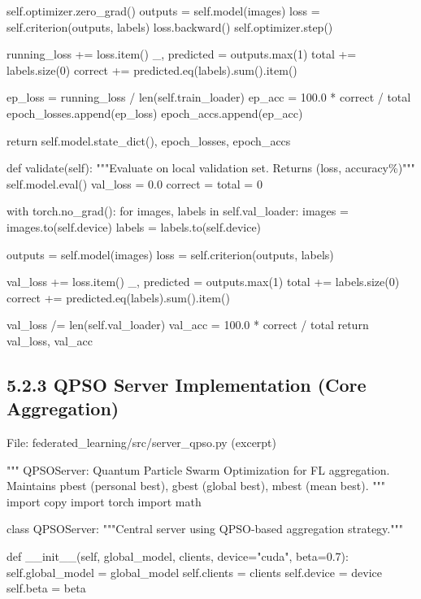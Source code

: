                 self.optimizer.zero\_grad()
                outputs = self.model(images)
                loss = self.criterion(outputs, labels)
                loss.backward()
                self.optimizer.step()
                
                running\_loss += loss.item()
                \_, predicted = outputs.max(1)
                total += labels.size(0)
                correct += predicted.eq(labels).sum().item()
            
            ep\_loss = running\_loss / len(self.train\_loader)
            ep\_acc = 100.0 * correct / total
            epoch\_losses.append(ep\_loss)
            epoch\_accs.append(ep\_acc)
        
        return self.model.state\_dict(), epoch\_losses, epoch\_accs
    
    def validate(self):
        """Evaluate on local validation set. Returns (loss, accuracy\%)"""
        self.model.eval()
        val\_loss = 0.0
        correct = total = 0
        
        with torch.no\_grad():
            for images, labels in self.val\_loader:
                images = images.to(self.device)
                labels = labels.to(self.device)
                
                outputs = self.model(images)
                loss = self.criterion(outputs, labels)
                
                val\_loss += loss.item()
                \_, predicted = outputs.max(1)
                total += labels.size(0)
                correct += predicted.eq(labels).sum().item()
        
        val\_loss /= len(self.val\_loader)
        val\_acc = 100.0 * correct / total
        return val\_loss, val\_acc


\subsection{5.2.3 QPSO Server Implementation (Core Aggregation)}
File: federated\_learning/src/server\_qpso.py (excerpt)

"""
QPSOServer: Quantum Particle Swarm Optimization for FL aggregation.
Maintains pbest (personal best), gbest (global best), mbest (mean best).
"""
import copy
import torch
import math

class QPSOServer:
    """Central server using QPSO-based aggregation strategy."""
    
    def \_\_init\_\_(self, global\_model, clients, device="cuda", beta=0.7):
        self.global\_model = global\_model
        self.clients = clients
        self.device = device
        self.beta = beta
        
